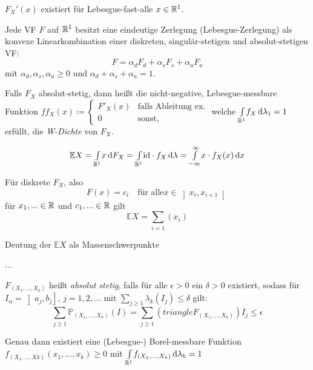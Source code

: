 \documentclass{cheat-sheet}
\renewcommand{\P}{\mathbb{P}}
\newcommand{\E}{\mathbb{E}} %
\begin{document}
\begin{satz}
  $F_X'(x)$ existiert für Lebesgue-fast-alle $x \in \mathbb{R}^1$.
\end{satz}

\begin{satz}
  Jede VF $F$ auf $\mathbb{R}^1$ besitzt eine eindeutige Zerlegung (Lebesgue-Zerlegung) als konvexe Linearkombination einer diskreten, singulär-stetigen und absolut-stetigen VF:
  \[ F = \alpha_d F_d + \alpha_s F_s + \alpha_a F_a \]
  mit $\alpha_d, \alpha_s, \alpha_a \geq 0$ und $\alpha_d + \alpha_s + \alpha_a = 1$.
\end{satz}

\begin{defn}
  Falls $F_X$ absolut-stetig, dann heißt die nicht-negative, Lebesgue-messbare Funktion $ff_X(x) \coloneqq \begin{cases} F'_X(x) & \text{falls Ableitung ex.} \\ 0 & \text{sonst,} \end{cases}$
  welche ${\textstyle \int\limits_{\mathbb{R}^1}^{}} f_X \,\mathrm{d} \lambda_1 = 1$ erfüllt, die \emph{W-Dichte} von $F_X$.
\end{defn}


\[ \E X = \Int{\R^1}{}{x}{F_X} = \Int{\R^1}{}{\id \cdot f_X}{\lambda} = \Int{- \infty}{\infty}{x \cdot f_X(x)}{x} \]

\begin{bem}
  Für diskrete $F_X$, also
  \[ F(x) = c_i \quad \text{für alle} x \in \left] x_i, x_{i+1} \right[ \]
  für $x_1, ... \in \mathbb{R}$ und $c_1, ... \in \mathbb{R}$ gilt
  \[ \E X = \sum_{i=1} (x_{i}) \]
\end{bem}


Deutung der $\E X$ als Massenschwerpunkte

...


$F_(X_1, ..., X_k)$ heißt \emph{absolut stetig}, falls für alle $\epsilon > 0$ ein $\delta > 0$ existiert, sodass für $I_{\alpha} = \left] a_j, b_j \right]$, $j = 1, 2, ...$ mit $\sum_{j \geq 1} \lambda_k(I_j) \leq \delta$ gilt:
\[ \sum_{j \geq 1} \P_{(X_1, ..., X_k)}(I) = \sum_{j \geq 1} (triangle F_{(X_1, ..., X_k)}) I_j \leq \epsilon \]

Genau dann existiert eine (Lebesgue-) Borel-messbare Funktion $f_{(X_1, ..., Xk)}(x_1, ..., x_k) \geq 0$ mit ${\textstyle \int\limits_{\mathbb{R}^1}^{}} f_{(X_1, ..., X_k)} \,\mathrm{d} \lambda_k = 1$
\end{document}

